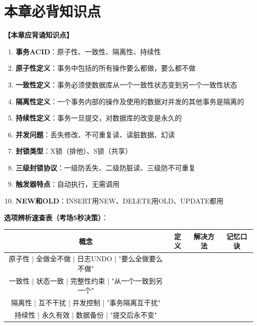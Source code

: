 \documentclass[12pt, a4paper]{article}
\newenvironment{bluebox}[1]{%
  \begin{trivlist}
  \item[\hskip\labelsep \textbf{#1}]
  \setlength{\parskip}{0.5ex}
  \setlength{\itemsep}{0.5ex}
}{%
  \end{trivlist}
  }
\begin{document}
\section{本章必背知识点}

\begin{bluebox}{命题人思维版}
	\textbf{【本章应背诵知识点】}

	\begin{enumerate}[leftmargin=*, label=\textbf{\arabic*.}]
		\item \textbf{事务ACID}：原子性、一致性、隔离性、持续性
		\item \textbf{原子性定义}：事务中包括的所有操作要么都做，要么都不做
		\item \textbf{一致性定义}：事务必须使数据库从一个一致性状态变到另一个一致性状态
		\item \textbf{隔离性定义}：一个事务内部的操作及使用的数据对并发的其他事务是隔离的
		\item \textbf{持续性定义}：事务一旦提交，对数据库的改变是永久的
		\item \textbf{并发问题}：丢失修改、不可重复读、读脏数据、幻读
		\item \textbf{封锁类型}：X锁（排他）、S锁（共享）
		\item \textbf{三级封锁协议}：一级防丢失、二级防脏读、三级防不可重复
		\item \textbf{触发器特点}：自动执行，无需调用
		\item \textbf{NEW和OLD}：INSERT用NEW、DELETE用OLD、UPDATE都用
	\end{enumerate}

	\textbf{选项辨析速查表（考场5秒决策）}：

	\begin{tabular}{|c|c|c|c|}
		\hline
		\textbf{概念} & \textbf{定义} & \textbf{解决方法} & \textbf{记忆口诀} \\
		\hline
		原子性 | 全做全不做 | 日志UNDO | "要么全做要么不做"                         \\
		\hline
		一致性 | 状态一致 | 完整性约束 | "从一个一致到另一个"                          \\
		\hline
		隔离性 | 互不干扰 | 并发控制 | "事务隔离互干扰"                             \\
		\hline
		持续性 | 永久有效 | 数据备份 | "提交后永不变"                              \\
		\hline
	\end{tabular}
\end{bluebox}
\end{document}
